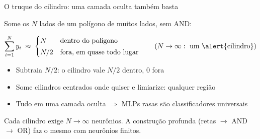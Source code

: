 \documentclass[aspectratio=169, 11pt]{beamer}
\begin{document}
\begin{frame}{O truque do cilindro: uma camada oculta também basta}

  Some os $N$ lados de um polígono de muitos lados, sem AND:

  \[
    \sum_{i=1}^{N} y_i \;\approx\;
    \begin{cases}
      N   & \text{dentro do polígono}\\[2pt]
      N/2 & \text{fora, em quase todo lugar}
    \end{cases}
    \qquad (N \to \infty:\ \text{um \alert{cilindro}})
  \]

  \begin{itemize}\setlength{\itemsep}{0.25ex}
    \item Subtraia $N/2$: o cilindro vale $N/2$ dentro, $0$ fora
    \item Some cilindros centrados onde quiser e limiarize: qualquer região
    \item Tudo em uma camada oculta $\Rightarrow$ MLPs rasas são
          classificadores universais
  \end{itemize}

  \smallskip
  \begin{alertabox}
    Cada cilindro exige $N \to \infty$ neurônios. A construção profunda
    (retas $\to$ AND $\to$ OR) faz o mesmo com neurônios finitos.
  \end{alertabox}
\end{frame}
\end{document}

